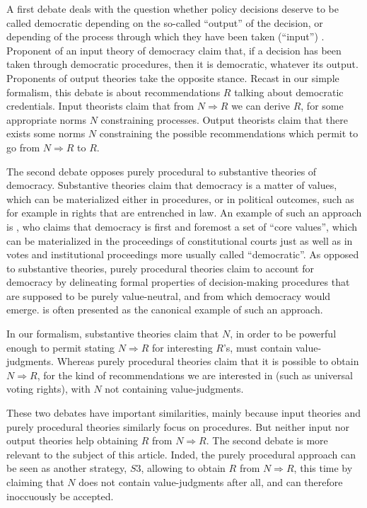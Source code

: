\documentclass[preprint, french, english, 11pt, authoryear]{elsarticle}%
\begin{document}
A first debate deals with the question whether policy decisions deserve to be called democratic depending on the so-called “output” of the decision, or depending of the process through which they have been taken (“input”) \cite{vatn_environmental_2016, backstrand_environmental_2010}. Proponent of an input theory of democracy claim that, if a decision has been taken through democratic procedures, then it is democratic, whatever its output. Proponents of output theories take the opposite stance. Recast in our simple formalism, this debate is about recommendations $R$ talking about democratic credentials. Input theorists claim that from $N ⇒ R$ we can derive $R$, for some appropriate norms $N$ constraining processes. Output theorists claim that there exists some norms $N$ constraining the possible recommendations which permit to go from $N ⇒ R$ to $R$.%

The second debate opposes purely procedural to substantive theories of democracy. Substantive theories claim that democracy is a matter of values, which can be materialized either in procedures, or in political outcomes, such as for example in rights that are entrenched in law. An example of such an approach is \cite{brettschneider_value_2006}, who claims that democracy is first and foremost a set of ``core values'', which can be materialized in the proceedings of constitutional courts just as well as in votes and institutional proceedings more usually called ``democratic''. As opposed to substantive theories, purely procedural theories claim to account for democracy by delineating formal properties of decision-making procedures that are supposed to be purely value-neutral, and from which democracy would emerge. \cite{habermas_faktizitat_1992} is often presented as the canonical example of such an approach. 

In our formalism, substantive theories claim that $N$, in order to be powerful enough to permit stating $N ⇒ R$ for interesting $R$’s, must contain value-judgments. Whereas purely procedural theories claim that it is possible to obtain $N ⇒ R$, for the kind of recommendations we are interested in (such as universal voting rights), with $N$ not containing value-judgments. 

These two debates have important similarities, mainly because input theories and purely procedural theories similarly focus on procedures.  But neither input nor output theories help obtaining $R$ from $N ⇒ R$. The second debate is more relevant to the subject of this article. Inded, the purely procedural approach can be seen as another strategy, $S3$, allowing to obtain $R$ from $N ⇒ R$, this time by claiming that $N$ does not contain value-judgments after all, and can therefore inoccuously be accepted.
\end{document}
